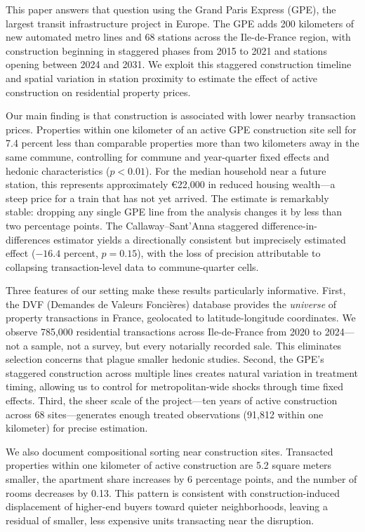 \documentclass[12pt]{article}
\begin{document}
This paper answers that question using the Grand Paris Express (GPE), the largest transit infrastructure project in Europe. The GPE adds 200 kilometers of new automated metro lines and 68 stations across the Ile-de-France region, with construction beginning in staggered phases from 2015 to 2021 and stations opening between 2024 and 2031. We exploit this staggered construction timeline and spatial variation in station proximity to estimate the effect of active construction on residential property prices.

Our main finding is that construction is associated with lower nearby transaction prices. Properties within one kilometer of an active GPE construction site sell for 7.4 percent less than comparable properties more than two kilometers away in the same commune, controlling for commune and year-quarter fixed effects and hedonic characteristics ($p < 0.01$). For the median household near a future station, this represents approximately \euro22,000 in reduced housing wealth---a steep price for a train that has not yet arrived. The estimate is remarkably stable: dropping any single GPE line from the analysis changes it by less than two percentage points. The Callaway--Sant'Anna staggered difference-in-differences estimator yields a directionally consistent but imprecisely estimated effect ($-16.4$ percent, $p = 0.15$), with the loss of precision attributable to collapsing transaction-level data to commune-quarter cells.

Three features of our setting make these results particularly informative. First, the DVF (Demandes de Valeurs Fonci\`eres) database provides the \textit{universe} of property transactions in France, geolocated to latitude-longitude coordinates. We observe 785,000 residential transactions across Ile-de-France from 2020 to 2024---not a sample, not a survey, but every notarially recorded sale. This eliminates selection concerns that plague smaller hedonic studies. Second, the GPE's staggered construction across multiple lines creates natural variation in treatment timing, allowing us to control for metropolitan-wide shocks through time fixed effects. Third, the sheer scale of the project---ten years of active construction across 68 sites---generates enough treated observations (91,812 within one kilometer) for precise estimation.

We also document compositional sorting near construction sites. Transacted properties within one kilometer of active construction are 5.2 square meters smaller, the apartment share increases by 6 percentage points, and the number of rooms decreases by 0.13. This pattern is consistent with construction-induced displacement of higher-end buyers toward quieter neighborhoods, leaving a residual of smaller, less expensive units transacting near the disruption.
\end{document}
